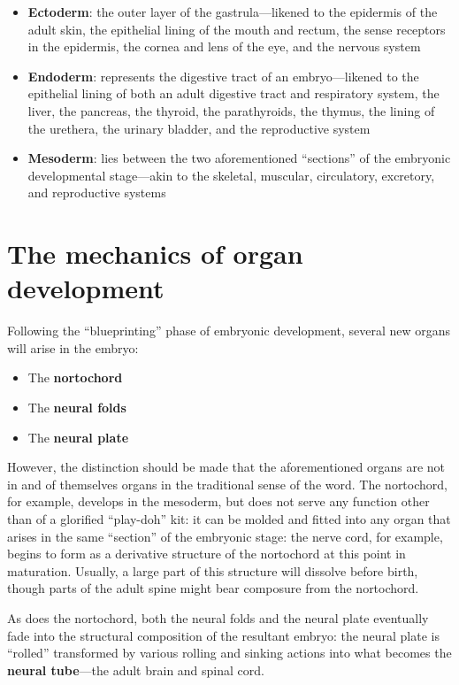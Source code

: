 \documentclass{article}
\begin{document}
\begin{itemize}
	\item \textbf{Ectoderm}: the outer layer of the gastrula---likened to the
		epidermis of the adult skin, the epithelial lining of the mouth and
		rectum, the sense receptors in the epidermis, the cornea and lens of
		the eye, and the nervous system
	\item \textbf{Endoderm}: represents the digestive tract of an embryo---likened
		to the epithelial lining of both an adult digestive tract and respiratory
		system, the liver, the pancreas, the thyroid, the parathyroids, the thymus,
		the lining of the urethera, the urinary bladder, and the reproductive system
	\item \textbf{Mesoderm}: lies between the two aforementioned ``sections'' of the
		embryonic developmental stage---akin to the skeletal, muscular, circulatory,
		excretory, and reproductive systems
\end{itemize}

\section{The mechanics of organ development}

Following the ``blueprinting'' phase of embryonic development, several new organs
will arise in the embryo:

\begin{itemize}
	\item The \textbf{nortochord}
	\item The \textbf{neural folds}
	\item The \textbf{neural plate}
\end{itemize}

However, the distinction should be made that the aforementioned organs are not in
and of themselves organs in the traditional sense of the word. The nortochord,
for example, develops in the mesoderm, but does not serve any function other than
of a glorified ``play-doh'' kit: it can be molded and fitted into any organ that
arises in the same ``section'' of the embryonic stage: the nerve cord, for example,
begins to form as a derivative structure of the nortochord at this point in
maturation. Usually, a large part of this structure will dissolve before birth,
though parts of the adult spine might bear composure from the nortochord.

As does the nortochord, both the neural folds and the neural plate eventually
fade into the structural composition of the resultant embryo: the neural plate
is ``rolled'' transformed by various rolling and sinking actions into what
becomes the \textbf{neural tube}---the adult brain and spinal cord.
\end{document}
